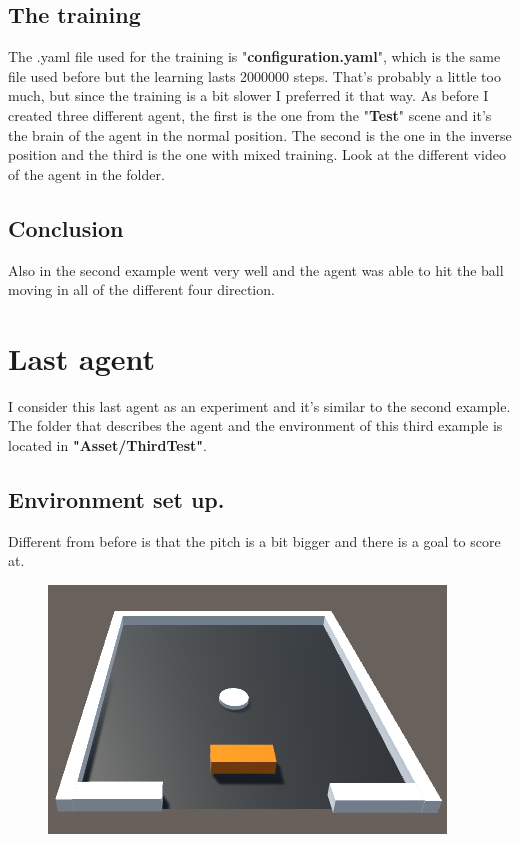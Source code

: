\documentclass[12pt]{article}
\begin{document}
\begin{itemize}
	\end{itemize}	
	
	\subsection{The training}
	The .yaml file used for the training is "\textbf{configuration.yaml}", which is the same file used before but the learning lasts 2000000 steps. That's probably a little too much, but since the training is a bit slower I preferred it that way.
	As before I created three different agent, the first is the one from the "\textbf{Test}" scene and it's the brain of the agent in the normal position. The second is the one in the inverse position and the third is the one with mixed training.
	Look at the different video of the agent in the folder.
	
	\subsection{Conclusion}
	Also in the second example went very well and the agent was able to hit the ball moving in all of the different four direction.
	
	\section{Last agent}
	I consider this last agent as an experiment and it's similar to the second example. The folder that describes the agent and the environment of this third example is located in \textbf{"Asset/ThirdTest"}.
	
	\subsection{Environment set up.}
	
	Different from before is that the pitch is a bit bigger and there is a goal to score at.
	
	\begin{figure}[hbt!]
		\centering
		\includegraphics[width= 1
		\textwidth]{images/NewField.png}
	\end{figure}
\end{document}
